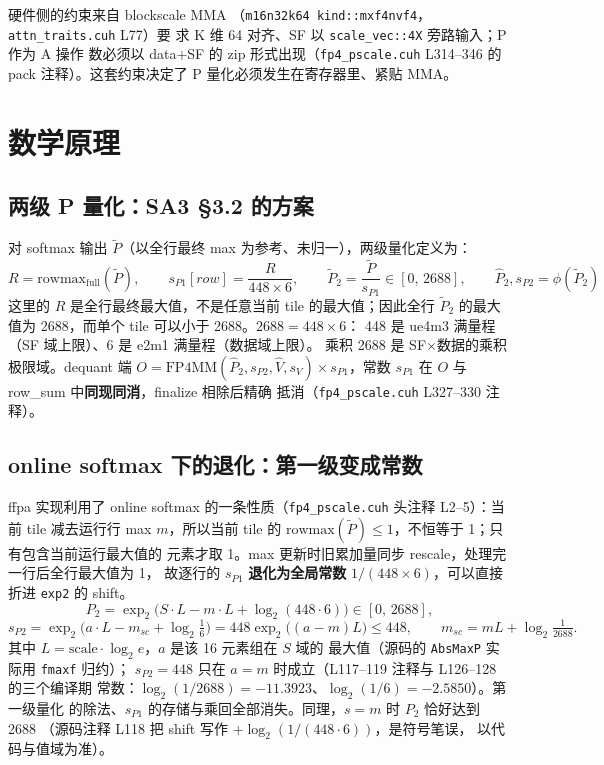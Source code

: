 硬件侧的约束来自 blockscale MMA
（\texttt{m16n32k64 kind::mxf4nvf4}，\texttt{attn\_traits.cuh} L77）要
求 K 维 64 对齐、SF 以 \texttt{scale\_vec::4X} 旁路输入；P 作为 A 操作
数必须以 data+SF 的 zip 形式出现（\texttt{fp4\_pscale.cuh} L314--346 的
pack 注释）。这套约束决定了 P 量化必须发生在寄存器里、紧贴 MMA。

\section{数学原理}

\subsection{两级 P 量化：SA3 §3.2 的方案}

对 softmax 输出 $\tilde P$（以全行最终 max 为参考、未归一），两级量化定义为：
\begin{equation}
  R=\mathrm{rowmax}_{\mathrm{full}}(\tilde P),\qquad
  s_{P1}[row]=\frac{R}{448\times6},\qquad
  \tilde P_2=\frac{\tilde P}{s_{P1}}\in[0,\,2688],\qquad
  \hat P_2,s_{P2}=\phi(\tilde P_2)
  \label{eq:32-two-level}
\end{equation}
这里的 $R$ 是全行最终最大值，不是任意当前 tile 的最大值；因此全行
$\tilde P_2$ 的最大值为 2688，而单个 tile 可以小于 2688。$2688=448\times6$：
448 是 ue4m3 满量程（SF 域上限）、6 是 e2m1 满量程（数据域上限）。
乘积 2688 是 SF$\times$数据的乘积极限域。dequant 端
$O=\mathrm{FP4MM}(\hat P_2,s_{P2},\hat V,s_V)\times s_{P1}$，常数
$s_{P1}$ 在 $O$ 与 row\_sum 中\textbf{同现同消}，finalize 相除后精确
抵消（\texttt{fp4\_pscale.cuh} L327--330 注释）。

\subsection{online softmax 下的退化：第一级变成常数}

ffpa 实现利用了 online softmax 的一条性质（\texttt{fp4\_pscale.cuh}
头注释 L2--5）：当前 tile 减去运行行 max $m$，所以当前 tile 的
$\mathrm{rowmax}(\tilde P)\le1$，不恒等于 1；只有包含当前运行最大值的
元素才取 1。max 更新时旧累加量同步 rescale，处理完一行后全行最大值为 1，
故逐行的 $s_{P1}$ \textbf{退化为全局常数} $1/(448\times6)$，可以直接折进
\texttt{exp2} 的 shift。
\begin{equation}
  P_2=\exp_2\!\bigl(S\cdot L-m\cdot L+\log_2(448\cdot6)\bigr)
  \in[0,\,2688],
  \label{eq:32-p2-domain}
\end{equation}
\begin{equation}
  s_{P2}=\exp_2\!\bigl(a\cdot L-m_{sc}+\log_2\tfrac{1}{6}\bigr)
  =448\exp_2\!\bigl((a-m)L\bigr)\le448,
  \qquad m_{sc}=mL+\log_2\tfrac1{2688}.
\end{equation}
其中 $L=\mathrm{scale}\cdot\log_2 e$，$a$ 是该 16 元素组在 $S$ 域的
最大值（源码的 \texttt{AbsMaxP} 实际用 \texttt{fmaxf} 归约）；
$s_{P2}=448$ 只在 $a=m$ 时成立（L117--119 注释与 L126--128 的三个编译期
常数：$\log_2(1/2688)=-11.3923$、$\log_2(1/6)=-2.5850$）。第一级量化
的除法、$s_{P1}$ 的存储与乘回全部消失。同理，$s=m$ 时 $P_2$ 恰好达到 2688
（源码注释 L118 把 shift 写作 $+\log_2(1/(448\cdot6))$，是符号笔误，
以代码与值域为准）。

